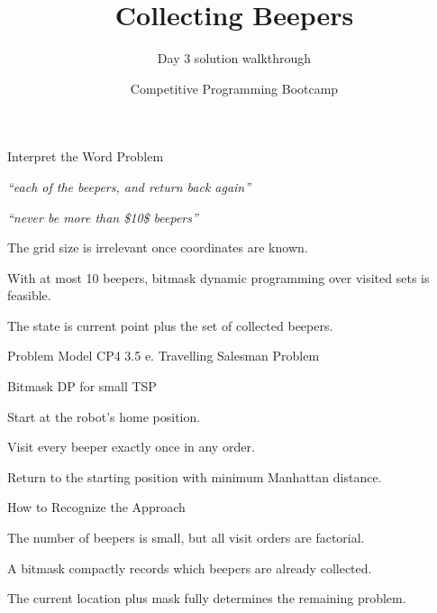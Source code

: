 \documentclass[aspectratio=169,11pt]{beamer}
\title[beepers]{Collecting Beepers}
\subtitle{Day 3 solution walkthrough}
\author[Solution Deck]{Competitive Programming Bootcamp}
\date{}
\begin{document}
\begin{frame}[plain]
  \titlepage
\end{frame}

\begin{frame}{Interpret the Word Problem}
\small
{}
\begin{tightitemize}
  \item \textit{``each of the beepers, and return back again''}
  \item \textit{``never be more than \$10\$ beepers''}
\end{tightitemize}

\vspace{0.18cm}
\begin{tightitemize}
  \item The grid size is irrelevant once coordinates are known.
  \item With at most 10 beepers, bitmask dynamic programming over visited sets is feasible.
  \item The state is current point plus the set of collected beepers.
\end{tightitemize}
\end{frame}







\begin{frame}{Problem Model}
\small
{} CP4 3.5 e. Travelling Salesman Problem

\vspace{0.25cm}
 Bitmask DP for small TSP

\vspace{0.25cm}
\begin{tightitemize}
  \item Start at the robot's home position.
  \item Visit every beeper exactly once in any order.
  \item Return to the starting position with minimum Manhattan distance.
\end{tightitemize}
\end{frame}

\begin{frame}{How to Recognize the Approach}
\begin{tightitemize}
  \item The number of beepers is small, but all visit orders are factorial.
  \item A bitmask compactly records which beepers are already collected.
  \item The current location plus mask fully determines the remaining problem.
\end{tightitemize}
\end{frame}
\end{document}
